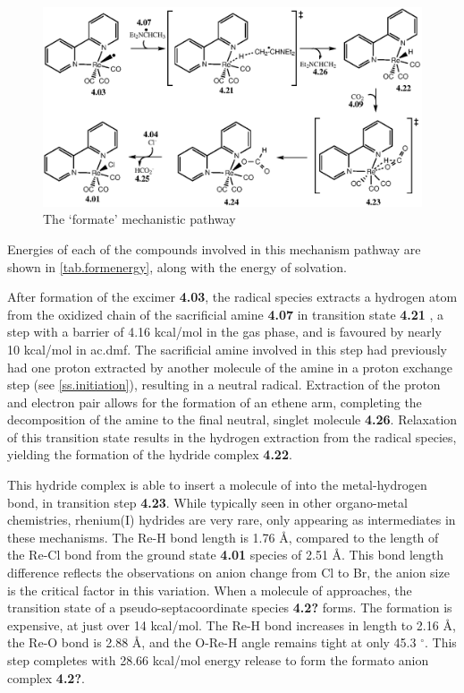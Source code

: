 \begin{figure}[!htb]
 \begin{center}
  \includegraphics[clip=true, width=\textwidth, keepaspectratio]{images/formate.eps}
 \end{center}
\caption{The `formate' mechanistic pathway}
\label{fig.formate}
\end{figure} 

Energies of each of the compounds involved in this mechanism pathway are shown in \autoref{tab.formenergy}, along with the energy of solvation.




After formation of the excimer \textbf{4.03}, the radical species extracts a hydrogen atom from the oxidized chain of the sacrificial amine \textbf{4.07} in transition state \textbf{4.21} , a step with a barrier of 4.16 kcal/mol in the gas phase, and is favoured by nearly 10 kcal/mol in \gls{ac.dmf}. The sacrificial amine involved in this step had previously had one proton extracted by another molecule of the amine in a proton exchange step (see \autoref{ss.initiation}), resulting in a neutral radical. Extraction of the proton and electron pair allows for the formation of an ethene arm, completing the decomposition of the amine to the final neutral, singlet molecule \textbf{4.26}. Relaxation of this transition state results in the hydrogen extraction from the radical species, yielding the formation of the hydride complex \textbf{4.22}. 

This hydride complex is able to insert a molecule of  into the metal-hydrogen bond, in transition step \textbf{4.23}. While typically seen in other organo-metal chemistries, rhenium(I) hydrides are very rare, only appearing as intermediates in these mechanisms. The Re-H bond length is 1.76 \r{A}, compared to the length of the Re-Cl bond from the ground state \textbf{4.01} species of 2.51 \r{A}. This bond length difference reflects the observations on anion change from Cl to Br, the anion size is the critical factor in this variation. When a molecule of  approaches, the transition state of a pseudo-septacoordinate species \textbf{4.2?} forms. The formation is expensive, at just over 14 kcal/mol. The Re-H bond increases in length to 2.16 \r{A}, the Re-O bond is 2.88 \r{A}, and the O-Re-H angle remains tight at only 45.3 $^\circ$. This step completes with 28.66 kcal/mol energy release to form the formato anion complex \textbf{4.2?}. 

